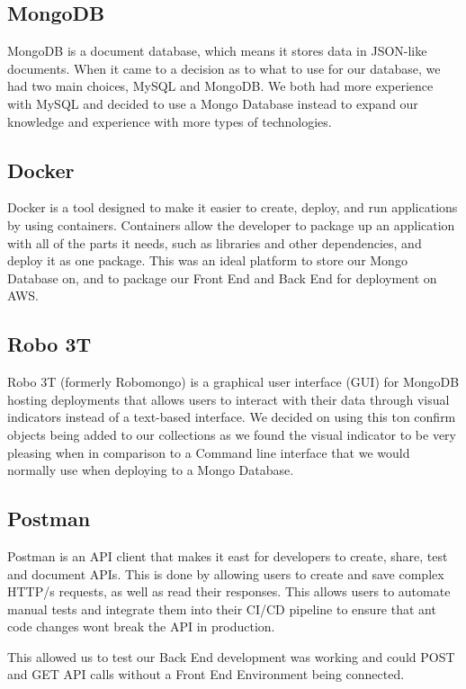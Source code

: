 \subsection{MongoDB}
MongoDB is a document database, which means it stores data in JSON-like documents. When it came to a decision as to what to use for our database, we had two main choices, MySQL and MongoDB. We both had more experience with MySQL and decided to use a Mongo Database instead to expand our knowledge and experience with more types of technologies.

\subsection{Docker}
Docker is a tool designed to make it easier to create, deploy, and run applications by using containers. Containers allow the developer to package up an application with all of the parts it needs, such as libraries and other dependencies, and deploy it as one package. This was an ideal platform to store our Mongo Database on, and to package our Front End and Back End for deployment on AWS.

\subsection{Robo 3T}
Robo 3T (formerly Robomongo) is a graphical user interface (GUI) for MongoDB hosting deployments that allows users to interact with their data through visual indicators instead of a text-based interface. We decided on using this ton confirm objects being added to our collections as we found the visual indicator to be very pleasing when in comparison to a Command line interface that we would normally use when deploying to a Mongo Database.

\subsection{Postman}
Postman is an API client that makes it east for developers to create, share, test and document APIs. This is done by allowing users to create and save complex HTTP/s requests, as well as read their responses. This allows users to automate manual tests and integrate them into their CI/CD pipeline to ensure that ant code changes wont break the API in production. \par
This allowed us to test our Back End development was working and could POST and GET API calls without a Front End Environment being connected.


